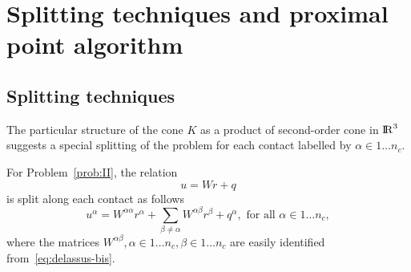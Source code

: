 \clearpage
\section{Splitting techniques and proximal point algorithm}
\label{Sec:SplittingTechniquesAndProx}

\subsection{Splitting techniques}
\label{Sec:SplittingTechniques}
 The particular structure of the cone $K$ as a product of second-order cone in $\mathrm{I\!R}^3$ suggests a special splitting of the problem for each contact labelled by $\alpha \in 1\ldots n_c$. 

For Problem~\ref{prob:II}, the relation
\begin{equation}
  \label{eq:delassus-bis}
  u = W r+q
\end{equation}
is split along each contact as follows
\begin{equation}
  \label{eq:delassus-ter}
  u^\alpha = W^{\alpha\alpha} r^\alpha + \sum_{\beta\neq \alpha}W^{\alpha\beta} r^\beta +  q^\alpha, \text{ for all } \alpha \in 1\ldots n_c,
\end{equation}
where the matrices $W^{\alpha\beta}, \alpha \in 1\ldots n_c, \beta \in 1\ldots n_c $ are easily identified from~\eqref{eq:delassus-bis}.
 
